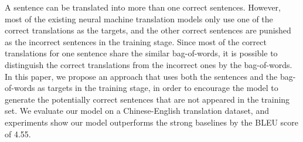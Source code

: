 A sentence can be translated into more than one correct sentences. However, most of the existing neural machine translation models only use one of the correct translations as the targets, and the other correct sentences are punished as the incorrect sentences in the training stage. Since most of the correct translations for one sentence share the similar bag-of-words, it is possible to distinguish the correct translations from the incorrect ones by the bag-of-words. In this paper, we propose an approach that uses both the sentences and the bag-of-words as targets in the training stage, in order to encourage the model to generate the potentially correct sentences that are not appeared in the training set. We evaluate our model on a Chinese-English translation dataset, and experiments show our model outperforms the strong baselines by the BLEU score of 4.55.
